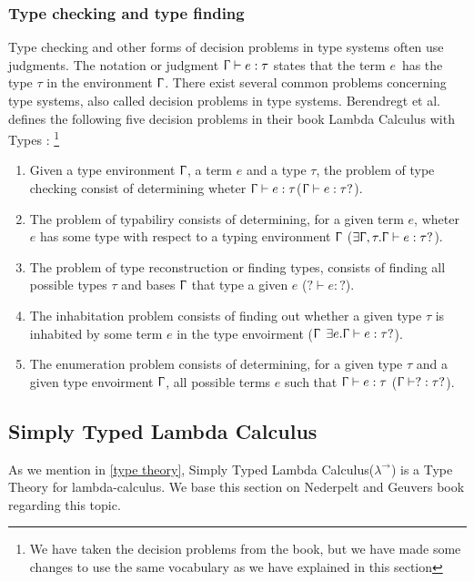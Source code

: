 \subsubsection{Type checking and type finding}
Type checking and other forms of decision problems in type systems often use judgments. The notation or judgment  $\Upgamma \vdash e:\tau$ states that the term $e$ has the type $\tau$ in the environment $\Upgamma$. There exist several common problems concerning type systems, also called decision problems in type systems. Berendregt et al. defines the following five decision problems in their book Lambda Calculus with Types \autocite{nederpelt_geuvers_lc}: \footnote{We have taken the decision problems from the book, but we have made some changes to use the same vocabulary as we have explained in this section
}

\begin{enumerate}
    \item Given a type environment $\Upgamma$, a term $e$ and a type $\tau$, the problem of type checking consist of determining wheter $\Upgamma\vdash e : \tau$($\Upgamma\vdash e : \tau ?$).
    \item The problem of typabiliry consists of determining, for a given term $e$, wheter $e$ has some type with respect to a typing environment $\Upgamma$ ($ \exists \Upgamma,\tau .\Upgamma\vdash e : \tau ?$).
    \item The problem of type reconstruction or finding types, consists of finding all possible types $\tau$ and bases $\Upgamma$ that type a given $e$ ($ ? \vdash e : ?$).
    \item The inhabitation problem consists of finding out whether a given type $\tau$ is inhabited by some term $e$ in the type envoirment ($\Upgamma$ $ \exists e.\Upgamma \vdash e : \tau?$).
    \item The enumeration problem consists of determining, for a given type $\tau$ and a given type envoirment $\Upgamma$, all possible terms $e$ such that $\Upgamma\vdash e : \tau$ ($\Upgamma\vdash ? : \tau ?$).

\end{enumerate}

\subsection{Simply Typed Lambda Calculus}
\label{Simply Typed Lambda Calculus}
As we mention in \autoref{type theory}, Simply Typed Lambda Calculus($\lambda^\rightarrow$) is a Type Theory for lambda-calculus. We base this section on Nederpelt and Geuvers book \autocite{nederpelt_geuvers_2014} regarding this topic. 

